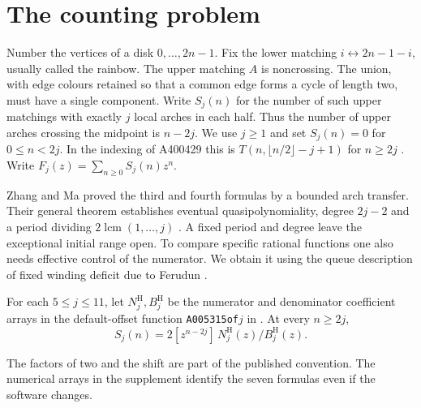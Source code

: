 

\begin{abstract}
Hunter Hogan gives rational functions for the winding diagonals five through eleven of the connected semi-meander triangle. We prove that the seven functions have the stated coefficients at every index. The proof bounds the multiplicities of individual cyclotomic factors and the degree of the numerator. This reduces the largest identity to coefficients through crossing number 418. Two finite transfers check the resulting integer polynomial identities. The same calculation recovers rational functions for further diagonals.
\end{abstract}

\section{The counting problem}
Number the vertices of a disk \(0,\ldots,2n-1\). Fix the lower matching \(i\leftrightarrow 2n-1-i\), usually called the rainbow. The upper matching \(A\) is noncrossing. The union, with edge colours retained so that a common edge forms a cycle of length two, must have a single component. Write \(S_j(n)\) for the number of such upper matchings with exactly \(j\) local arches in each half. Thus the number of upper arches crossing the midpoint is \(n-2j\). We use \(j\ge1\) and set \(S_j(n)=0\) for \(0\le n<2j\). In the indexing of A400429 this is \(T(n,\lfloor n/2\rfloor-j+1)\) for \(n\ge2j\) \cite{hogan,triangle}. Write \(F_j(z)=\sum_{n\ge0}S_j(n)z^n\).

Zhang and Ma proved the third and fourth formulas by a bounded arch transfer. Their general theorem establishes eventual quasipolynomiality, degree \(2j-2\) and a period dividing \(2\operatorname{lcm}(1,\ldots,j)\) \cite[Thms.~1--2]{zm}. A fixed period and degree leave the exceptional initial range open. To compare specific rational functions one also needs effective control of the numerator. We obtain it using the queue description of fixed winding deficit due to Ferudun \cite{ferudun}.

\begin{theorem}\label{thm:hogan}
For each \(5\le j\le11\), let \(N_j^{\mathrm H},B_j^{\mathrm H}\) be the numerator and denominator coefficient arrays in the default-offset function \texttt{A005315of}\(j\) in \cite{hogan}. At every \(n\ge 2j\),
\[
 S_j(n)=2[z^{n-2j}]\,N_j^{\mathrm H}(z)/B_j^{\mathrm H}(z).
\]
\end{theorem}
The factors of two and the shift are part of the published convention. The numerical arrays in the supplement identify the seven formulas even if the software changes.

